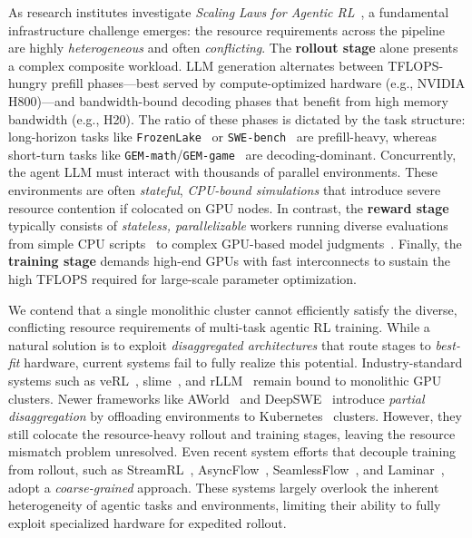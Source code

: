 As research institutes investigate \emph{Scaling Laws for Agentic RL}~\cite
{kimiteam2025kimik2openagentic,deepseek_v3_2_speciale}, a fundamental
infrastructure challenge emerges: the resource requirements across the
pipeline are highly \emph{heterogeneous} and often \emph{conflicting}. 
The \textbf{rollout stage}
alone presents a complex composite workload. LLM generation alternates
between TFLOPS-hungry prefill phases---best served by compute-optimized
hardware (e.g., NVIDIA H800)---and bandwidth-bound decoding phases that benefit
from high memory bandwidth (e.g., H20). The ratio of these phases is dictated
by the task structure: long-horizon tasks like \texttt{FrozenLake}~\cite{frozen_lake} or \texttt{SWE-bench}~\cite{swe-bench} are
prefill-heavy, whereas short-turn tasks like \texttt{GEM-math}/\texttt{GEM-game}~\cite{GEM-github} are decoding-dominant.
Concurrently, the agent LLM must interact with thousands of parallel
environments. These environments are often
\emph{stateful}, \emph{CPU-bound simulations} that introduce severe resource contention if
colocated on GPU nodes. In contrast, the \textbf{reward stage} typically consists of
\emph{stateless, parallelizable} workers running diverse evaluations 
from simple CPU scripts~\cite{he2025deepmath,guo2024deepseekCoder}
to complex GPU-based model judgments~\cite{son2024llmasajudgerewardmodel,zhong2024rlhfuseefficientrlhftraining}. Finally, the \textbf{training stage} demands 
high-end GPUs with fast interconnects to sustain the high TFLOPS required for large-scale parameter optimization.


We contend that a single monolithic cluster cannot efficiently satisfy the
diverse, conflicting resource requirements of multi-task agentic RL training.
While a natural solution is to exploit \emph{disaggregated architectures} that
route stages to \emph{best-fit} hardware, current systems fail to fully
realize this potential. Industry-standard systems such as veRL~\cite
{verl,sheng2025hybridflow}, slime~\cite{slime_github}, and rLLM~\cite
{rLLM} remain bound to monolithic GPU clusters. Newer frameworks like AWorld~\cite{aworld} and
DeepSWE~\cite{deepswe2025} introduce \emph{partial disaggregation} by
offloading environments to Kubernetes~\cite{k8s} clusters. However, they still
colocate the resource-heavy rollout and training stages, leaving the resource
mismatch problem unresolved. Even recent system efforts that decouple
training from rollout, such as StreamRL~\cite{StreamRL}, AsyncFlow~\cite
{asyncflow}, SeamlessFlow~\cite{seamlessflow}, and Laminar~\cite
{Laminar}, adopt a \emph{coarse-grained} approach. These systems largely
overlook the inherent heterogeneity of agentic tasks and environments,
limiting their ability to fully exploit specialized hardware for expedited
rollout.




